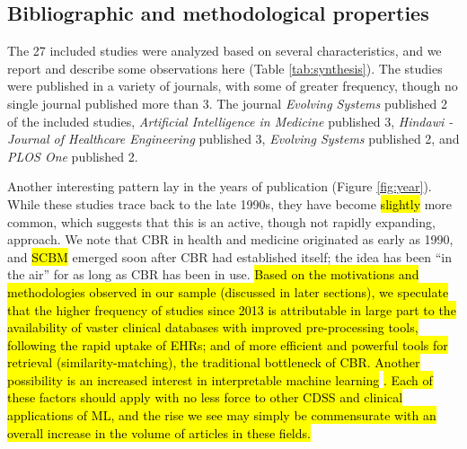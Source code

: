 \documentclass[sn-mathphys,Numbered,pdflatex]{sn-jnl}
\theoremstyle{remark}
\theoremstyle{definition}
\begin{document}
\subsection{Bibliographic and methodological
properties}\label{bibliographic-and-methodological-properties}

The 27 included studies were analyzed based on several characteristics,
and we report and describe some observations here (Table
\ref{tab:synthesis}). The studies were published in a variety of
journals, with some of greater frequency, though no single journal
published more than 3. The journal \emph{Evolving Systems} published 2
of the included studies, \emph{Artificial Intelligence in Medicine}
published 3, \emph{Hindawi - Journal of Healthcare Engineering}
published 3, \emph{Evolving Systems} published 2, and \emph{PLOS One}
published 2.

Another interesting pattern lay in the years of publication (Figure
\ref{fig:year}). While these studies trace back to the late 1990s, they
have become \hl{slightly }more common, which suggests that this is an
active, though not rapidly expanding, approach. We note that CBR in
health and medicine originated as early as 1990, and \hl{SCBM} emerged
soon after CBR had established itself; the idea has been ``in the air''
for as long as CBR has been in use.
\hl{ Based on the motivations and methodologies observed in our sample (discussed in later sections), we speculate that the higher frequency of studies since 2013 is attributable in large part to the availability of vaster clinical databases with improved pre-processing tools, following the rapid uptake of EHRs; and of more efficient and powerful tools for retrieval (similarity-matching), the traditional bottleneck of CBR. Another possibility is an increased interest in interpretable machine learning }\citep{Rudin2022}\hl{. Each of these factors should apply with no less force to other CDSS and clinical applications of ML, and the rise we see may simply be commensurate with an overall increase in the volume of articles in these fields.}

\small
\end{document}
